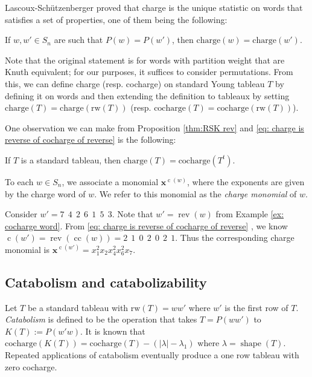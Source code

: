 \documentclass[ALCO, Unicode]{cedram}
\DeclareMathOperator{\shape}{shape}
\DeclareMathOperator{\rev}{rev}
\DeclareMathOperator{\cc}{cc}
\DeclareMathOperator{\cw}{c}
\begin{document}
Lascoux-Sch\"{u}tzenberger \cite{LS1}  proved that charge is the unique statistic on words that satisfies a set of properties, one of them being the following:

\begin{thm}
    If $w,w' \in S_n$ are such that $P(w) = P(w')$, then $\text{charge}(w) = \text{charge}(w')$.
\end{thm} 
Note that the original statement is  for words with partition weight that are Knuth equivalent; for our purposes, it suffices to consider permutations.
From this, we can define charge (resp. cocharge) on standard Young tableau $T$ by defining it on words and then extending the definition to tableaux by setting $\text{charge}(T) = \text{charge}(\text{rw}(T))$ (resp. $\text{cocharge}(T) = \text{cocharge}(\text{rw}(T))$).

One observation we can make from Proposition \ref{thm:RSK rev} and \eqref{eq: charge is reverse of cocharge of reverse} is the following:

\begin{prop}\label{thm: charge cocharge trabspose}
    If $T$ is a standard tableau, then
    $\text{charge}(T) = \text{cocharge}(T^t)$.
\end{prop}


To each $w \in S_n$, we associate a monomial $\mathbf{x}^{\cw(w)}$, where the exponents are given by the charge word of $w$. We refer to this monomial as the \textit{charge monomial }of $w$. 
\begin{ex}
Consider $w' = 7 \ \ 4 \ \ 2 \ \ 6\ \ 1 \ \ 5 \ \ 3 .$  Note that $w' = \rev(w)$ from Example \ref{ex: cocharge word}.
From \eqref{eq: charge is reverse of cocharge of reverse} , we know 
$\cw(w') = \rev(\cc(w)) = 2 \ \ 1 \ \ 0 \ \ 2 \ \ 0 \ \ 2 \ \ 1 $. Thus the corresponding charge monomial is $\mathbf{x}^{\cw(w')} = x_1^2 x_2 x_4^2x_6^2x_7.$
\end{ex}


\subsection{Catabolism and catabolizability}\label{section:cat}
Let $T$ be a standard tableau with $\text{rw}(T) = w w'$ where $w'$ is the first row of $T$. \textit{Catabolism} is defined to be the operation that takes $T = P(w w')$ to $K(T) := P(w' w)$. It is known that $\text{cocharge}(K(T)) = \text{cocharge}(T)- (|\lambda| - \lambda_1)$ where $\lambda = \shape(T)$. Repeated applications of catabolism eventually produce a one row tableau with zero cocharge.
\end{document}
